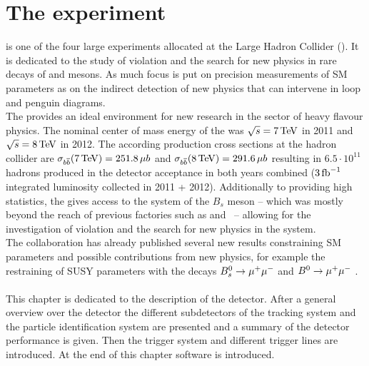 \chapter{The \lhcb experiment}
\label{chapter2}
\lhcb is one of the four large experiments allocated at the Large Hadron Collider (\lhc). It is dedicated to the study of \CP violation and the search for new physics in rare decays of \B and \D mesons. As much focus is put on precision measurements of SM parameters as on the indirect detection of new physics that can intervene in loop and penguin diagrams.\\
The \lhc provides an ideal environment for new research in the sector of heavy flavour physics. The nominal center of mass energy of the \lhc was $\sqrt{s}=7\mathrm{\,Te\kern -0.1em V}$ in 2011 and $\sqrt{s}=8\mathrm{\,Te\kern -0.1em V}$ in 2012. The according \bbbar production cross sections at the hadron collider are $\sigma_{b\overline {b}}(7\mathrm{\,Te\kern -0.1em V})= 251.8\, \mu b$ and $\sigma_{b\overline {b}}(8\mathrm{\,Te\kern -0.1em V})= 291.6\, \mu b$ \cite{pythia} resulting in $6.5 \cdot 10^{11}$ \B hadrons produced in the \lhcb detector acceptance in both years combined ($3\mbox{\,fb}^{-1}$ integrated luminosity collected in 2011 + 2012). 
Additionally to providing high statistics, the \lhc gives access to the system of the $B_s$ meson -- which was mostly beyond the reach of previous \bquark factories such as \babar and \belle \ -- allowing for the investigation of \CP violation and the search for new physics in the \Bs system.\\ 
The \lhcb collaboration has already published several new results constraining SM parameters and possible contributions from new physics, for example the restraining of SUSY parameters with the decays $B^0_s \rightarrow \mu^+ \mu^-$ and $B^0 \rightarrow \mu^+ \mu^-$ \cite{bsmumu}.\\
\\
This chapter is dedicated to the description of the \lhcb detector. After a general overview over the detector the different subdetectors of the tracking system and the particle identification system are presented and a summary of the detector performance is given. Then the \lhcb trigger system and different trigger lines are introduced. At the end of this chapter \lhcb software is introduced. \\
 
